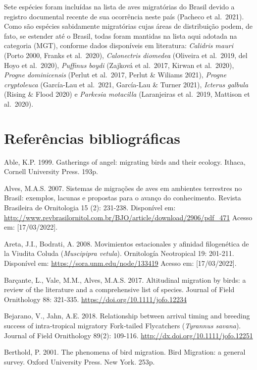 \documentclass[
  oneside]{scrbook}
\begin{document}
Sete espécies foram incluídas na lista de aves migratórias do Brasil devido a registro documental recente de sua ocorrência neste país (Pacheco et al.~2021). Como são espécies sabidamente migratórias cujas áreas de distribuição podem, de fato, se estender até o Brasil, todas foram mantidas na lista aqui adotada na categoria (MGT), conforme dados disponíveis em literatura: \emph{Calidris mauri} (Porto 2000, Franks et al.~2020), \emph{Calonectris diomedea} (Oliveira et al.~2019, del Hoyo et al.~2020), \emph{Puffinus boydi} (Zajková et al.~2017, Kirwan et al.~2020), \emph{Progne dominicensis} (Perlut et al.~2017, Perlut \& Wiliams 2021), \emph{Progne cryptoleuca} (García-Lau et al.~2021, García-Lau \& Turner 2021), \emph{Icterus galbula} (Rising \& Flood 2020) e \emph{Parkesia motacilla} (Laranjeiras et al.~2019, Mattison et al.~2020).

\hypertarget{referuxeancias-bibliogruxe1ficas-1}{%
\section{Referências bibliográficas}\label{referuxeancias-bibliogruxe1ficas-1}}

Able, K.P. 1999. Gatherings of angel: migrating birds and their ecology. Ithaca, Cornell University Press. 193p.

Alves, M.A.S. 2007. Sistemas de migrações de aves em ambientes terrestres no Brasil: exemplos, lacunas e propostas para o avanço do conhecimento. Revista Brasileira de Ornitologia 15 (2): 231-238. Disponível em: \url{http://www.revbrasilornitol.com.br/BJO/article/download/2906/pdf_471} Acesso em: {[}17/03/2022{]}.

Areta, J.I., Bodrati, A. 2008. Movimientos estacionales y afinidad filogenética de la Viudita Coluda (\emph{Muscipipra vetula}). Ornitología Neotropical 19: 201-211. Disponível em: \url{https://sora.unm.edu/node/133419} Acesso em: {[}17/03/2022{]}.

Barçante, L., Vale, M.M., Alves, M.A.S. 2017. Altitudinal migration by birds: a review of the literature and a comprehensive list of species. Journal of Field Ornithology 88: 321-335. \url{https://doi.org/10.1111/jofo.12234}

Bejarano, V., Jahn, A.E. 2018. Relationship between arrival timing and breeding success of intra‐tropical migratory Fork‐tailed Flycatchers (\emph{Tyrannus savana}). Journal of Field Ornithology 89(2): 109-116. \url{http://dx.doi.org/10.1111/jofo.12251}

Berthold, P. 2001. The phenomena of bird migration. Bird Migration: a general survey. Oxford University Press. New York. 253p.
\end{document}
